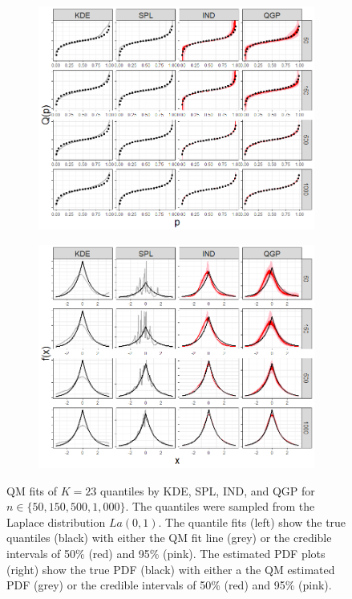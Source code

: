 \documentclass[preprint,12pt,authoryear]{elsarticle}
\begin{document}
\begin{figure}
\centering
\begin{subfigure}{.5\textwidth}
  \centering
  \includegraphics[width=.95\linewidth]{Images/quants_lp.png}
\end{subfigure}%
\begin{subfigure}{.5\textwidth}
  \centering
  \includegraphics[width=.95\linewidth]{Images/dens_lp.png}
\end{subfigure}
\caption{QM fits of $K=23$ quantiles by KDE, SPL, IND, and QGP for $n \in \{50, 150, 500, 1{,}000\}$. The quantiles were sampled from the Laplace distribution $La(0,1)$. The quantile fits (left) show the true quantiles (black) with either the QM fit line (grey) or the credible intervals of 50\% (red) and 95\% (pink). 
The estimated PDF plots (right) show the true PDF (black) with either a the QM estimated PDF (grey) or the credible intervals of 50\% (red) and 95\% (pink).}
\label{fig:lp_fits}
\end{figure}
\end{document}
